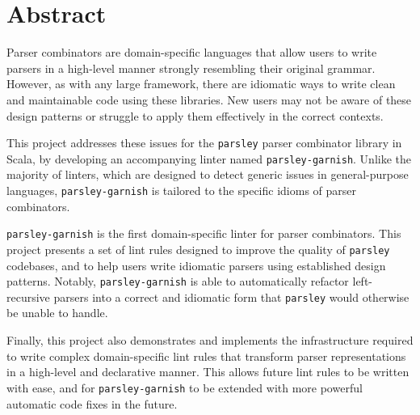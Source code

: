 \documentclass[../../main.tex]{subfiles}
\begin{document}
\hspace{0pt}
\vfill
\section*{\centering Abstract}
\noindent
Parser combinators are domain-specific languages that allow users to write parsers in a high-level manner strongly resembling their original grammar.
However, as with any large framework, there are idiomatic ways to write clean and maintainable code using these libraries.
New users may not be aware of these design patterns or struggle to apply them effectively in the correct contexts.
\newline

\noindent
This project addresses these issues for the \texttt{parsley} parser combinator library in Scala, by developing an accompanying linter named \texttt{parsley-garnish}.
Unlike the majority of linters, which are designed to detect generic issues in general-purpose languages, \texttt{parsley-garnish} is tailored to the specific idioms of parser combinators.
\newline

\noindent
\texttt{parsley-garnish} is the first domain-specific linter for parser combinators.
This project presents a set of lint rules designed to improve the quality of \texttt{parsley} codebases, and to help users write idiomatic parsers using established design patterns.
Notably, \texttt{parsley-garnish} is able to automatically refactor left-recursive parsers into a correct and idiomatic form that \texttt{parsley} would otherwise be unable to handle.
\newline

\noindent
Finally, this project also demonstrates and implements the infrastructure required to write complex domain-specific lint rules that transform parser representations in a high-level and declarative manner.
This allows future lint rules to be written with ease, and for \texttt{parsley-garnish} to be extended with more powerful automatic code fixes in the future.
\vfill
\hspace{0pt}
\end{document}
